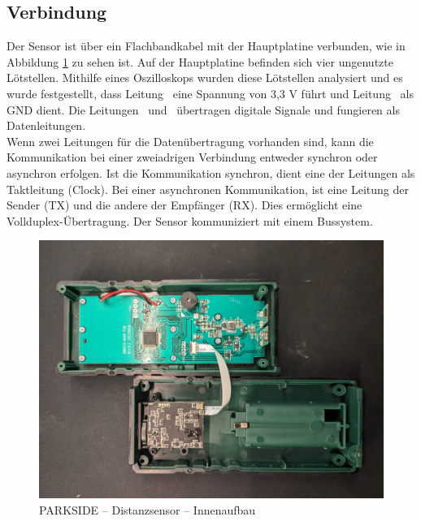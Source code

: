 \subsection{Verbindung}
Der Sensor ist über ein Flachbandkabel mit der Hauptplatine verbunden, wie in Abbildung \ref{img_2_2:sen_dis_parkside:1} zu sehen ist. Auf der Hauptplatine befinden sich vier ungenutzte Lötstellen. Mithilfe eines Oszilloskops wurden diese Lötstellen analysiert und es wurde festgestellt, dass Leitung \flqq\ eine Spannung von 3,3 V führt und Leitung \flqq\ als GND dient. Die Leitungen \flqq\ und \flqq\ übertragen digitale Signale und fungieren als Datenleitungen.\\
Wenn zwei Leitungen für die Datenübertragung vorhanden sind, kann die Kommunikation bei einer zweiadrigen Verbindung entweder synchron oder asynchron erfolgen. Ist die Kommunikation synchron, dient eine der Leitungen als Taktleitung (Clock). Bei einer asynchronen Kommunikation, ist eine Leitung der Sender (TX) und die andere der Empfänger (RX). Dies ermöglicht eine Vollduplex-Übertragung.
Der Sensor kommuniziert mit einem Bussystem.



\pagebreak[1]
\begin{figure}[ht]
	\begin{center}
		\includegraphics[width=1\textwidth]{img/2_sen/dis_parkside_1_outside.png}
		\caption{PARKSIDE – Distanzsensor – Innenaufbau}
		\label{img_2_2:sen_dis_parkside:1}
	\end{center}
\end{figure}
\pagebreak[1]

